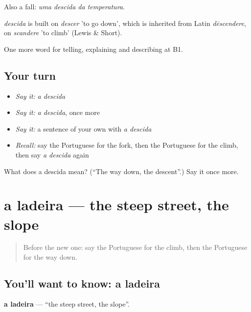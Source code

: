 Also a fall: \emph{uma descida da temperatura}.

\begin{cousinweb}
\emph{descida} is built on \emph{descer} 'to go down', which is inherited from Latin \emph{dēscendere}, on \emph{scandere} 'to climb' (Lewis \& Short).
\end{cousinweb}

\begin{grammarlens}[title={What you've built}]
One more word for telling, explaining and describing at B1.
\end{grammarlens}

\subsection*{Your turn}
\begin{itemize}
\raggedright
  \item \emph{Say it:} \emph{a descida}
  \item \emph{Say it:} \emph{a descida}, once more
  \item \emph{Say it:} a sentence of your own with \emph{a descida}
  \item \emph{Recall:} say the Portuguese for the fork, then the Portuguese for the climb, then say \emph{a descida} again
\end{itemize}

\begin{tcolorbox}[breakable,colback=teal!4,colframe=teal!35!black,title={Before you move on}]
What does a descida mean? (\textquotedblleft{}The way down, the descent\textquotedblright{}.) Say it once more.
\end{tcolorbox}
\section[a ladeira]{a ladeira — the steep street, the slope}

\label{lesson:PT-C438-ladeira}



\begin{quote}
Before the new one: say the Portuguese for the climb, then the Portuguese for the way down.
\end{quote}

\subsection*{You'll want to know: a ladeira}
\textbf{a ladeira} — \textquotedblleft{}the steep street, the slope\textquotedblright{}.

